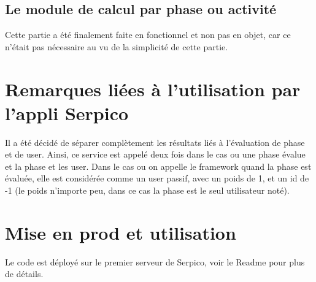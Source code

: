 \documentclass[colorised, sobre]{template} %
\def\usr{user}
\begin{document}
    \subsection{Le module de calcul par phase ou activité}
        Cette partie a été finalement faite en fonctionnel et non pas en objet, car ce n'était pas nécessaire au vu de la simplicité de cette partie. 
    
\section{Remarques liées à l'utilisation par l'appli Serpico}
Il a été décidé de séparer complètement les résultats liés à l'évaluation de phase et de user. Ainsi, ce service est appelé deux fois dans le cas ou une phase évalue et la phase et les \usr. Dans le cas ou on appelle le framework quand la phase est évaluée, elle est considérée comme un \usr{} passif, avec un poids de 1, et un id de -1 (le poids n'importe peu, dans ce cas la phase est le seul utilisateur noté).
\section{Mise en prod et utilisation}
Le code est déployé sur le premier serveur de Serpico, voir le Readme pour plus de détails.
\end{document}
